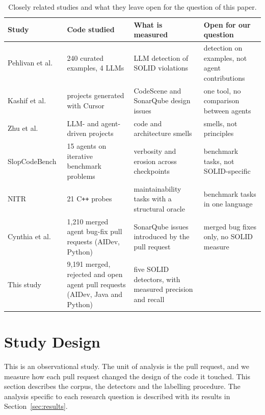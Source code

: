\documentclass[sigconf]{acmart}
\begin{document}
\begin{table}[t]
\caption{Closely related studies and what they leave open for the question of this paper.}
\label{tab:related}
\footnotesize
\begin{tabular}{@{}L{3.3cm}L{4.4cm}L{4.4cm}L{4.6cm}@{}}
\toprule
\textbf{Study} & \textbf{Code studied} & \textbf{What is measured} & \textbf{Open for our question} \\
\midrule
Pehlivan et al.~\cite{pehlivan2025solid} & 240 curated examples, 4 LLMs & LLM detection of SOLID
violations & detection on examples, not agent contributions \\
Kashif et al.~\cite{beyond2026designissues} & projects generated with Cursor & CodeScene and
SonarQube design issues & one tool, no comparison between agents \\
Zhu et al.~\cite{zhu2026smells} & LLM- and agent-driven projects & code and architecture smells &
smells, not principles \\
SlopCodeBench~\cite{slopcodebench2026} & 15 agents on iterative benchmark problems & verbosity and
erosion across checkpoints & benchmark tasks, not SOLID-specific \\
NITR~\cite{zhu2026nitr} & 21 C\texttt{++} probes & maintainability tasks with a structural oracle &
benchmark tasks in one language \\
Cynthia et al.~\cite{cynthia2026postmerge} & 1,210 merged agent bug-fix pull requests (AIDev,
Python) & SonarQube issues introduced by the pull request & merged bug fixes only, no SOLID
measure \\
\midrule
This study & 9,191 merged, rejected and open agent pull requests (AIDev, Java and Python) & five
SOLID detectors, with measured precision and recall & \\
\bottomrule
\end{tabular}
\end{table}

\section{Study Design}
\label{sec:design}

This is an observational study. The unit of analysis is the pull request, and we measure how each pull
request changed the design of the code it touched. This section describes the corpus, the detectors
and the labelling procedure. The analysis specific to each research question is described with its
results in Section~\ref{sec:results}.
\end{document}
